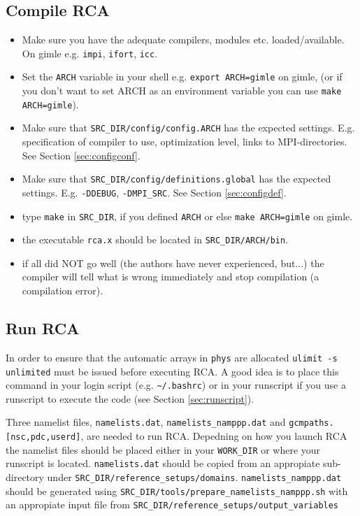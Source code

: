 \documentclass{article}
\begin{document}
\subsection{Compile RCA}
\begin{itemize}
  \item Make sure you have the adequate compilers, modules etc. loaded/available.
        On gimle e.g. \verb+impi+, \verb+ifort+, \verb+icc+.
  \item Set the \verb+ARCH+ variable in your shell e.g. \verb+export ARCH=gimle+ on gimle, 
    (or if you don't want to set ARCH as an environment variable you can use \verb+make ARCH=gimle+). 
  \item Make sure that \verb+SRC_DIR/config/config.ARCH+ has the expected settings.
        E.g. specification of compiler to use, optimization level, links to MPI-directories. 
        See Section \ref{sec:configconf}.
  \item Make sure that \verb+SRC_DIR/config/definitions.global+ has the expected settings.
        E.g. \verb+-DDEBUG+, \verb+-DMPI_SRC+.
        See Section \ref{sec:configdef}.
  \item type \verb+make+ in \verb+SRC_DIR+, if you defined \verb+ARCH+ or else \verb+make ARCH=gimle+ on gimle.
  \item the executable \verb+rca.x+ should be
    located in \verb+SRC_DIR/ARCH/bin+.
  \item if all did NOT go well (the authors have never experienced,
    but...) the compiler will tell what is wrong immediately and stop
    compilation (a compilation error).
\end{itemize}

\subsection{Run RCA}

In order to ensure that the automatic arrays in \verb+phys+ are
allocated \verb+ulimit -s unlimited+ must be issued before
executing RCA. A good idea is to place this command in your
login script (e.g. \verb+~/.bashrc+) or in your runscript if you
use a runscript to execute the code (see Section \ref{sec:runscript}).

Three namelist files, \verb+namelists.dat+, \verb+namelists_namppp.dat+ and \verb+gcmpaths.[nsc,pdc,userd]+, are needed to run RCA.
Depedning on how you launch RCA the namelist files should be placed either in your \verb+WORK_DIR+
or where your runscript is located.
\verb+namelists.dat+ should be copied from an appropiate sub-directory under
\verb+SRC_DIR/reference_setups/domains+.
\verb+namelists_namppp.dat+ should be generated using \verb+SRC_DIR/tools/prepare_namelists_namppp.sh+
with an appropiate input file from \verb+SRC_DIR/reference_setups/output_variables+
\end{document}
